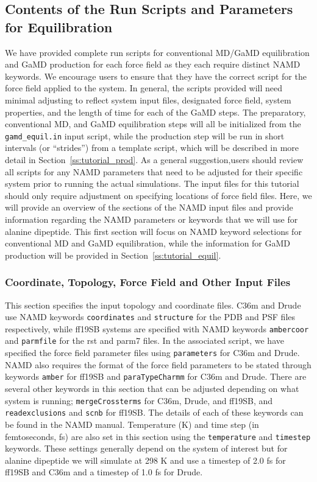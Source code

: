 \documentclass[9pt,tutorial]{livecoms}
\begin{document}
\subsection{Contents of the Run Scripts and Parameters for Equilibration} 
We have provided complete run scripts for conventional MD/GaMD equilibration and GaMD production for each force field as they each require distinct NAMD keywords. We encourage users to ensure that they have the correct script for the force field applied to the system. In general, the scripts provided will need minimal adjusting to reflect system input files, designated force field, system properties, and the length of time for each of the GaMD steps. The preparatory, conventional MD, and GaMD equilibration steps will all be initialized from the \texttt{gamd\_equil.in} input script, while the production step will be run in short intervals (or ``strides'') from a template script, which will be described in more detail in Section~\ref{ss:tutorial_prod}. As a general suggestion,users should review all scripts for any NAMD parameters that need to be adjusted for their specific system prior to running the actual simulations. The input files for this tutorial should only require adjustment on specifying locations of force field files. Here, we will provide an overview of the sections of the NAMD input files and provide information regarding the NAMD parameters or keywords that we will use for alanine dipeptide. This first section will focus on NAMD keyword selections for conventional MD and GaMD equilibration, while the information for GaMD production will be provided in Section~\ref{ss:tutorial_equil}. 

\subsubsection{Coordinate, Topology, Force Field and Other Input Files}
This section specifies the input topology and coordinate files. C36m and Drude use NAMD keywords \texttt{coordinates} and \texttt{structure} for the PDB and PSF files respectively, while ff19SB systems are specified with NAMD keywords \texttt{ambercoor} and \texttt{parmfile} for the rst and parm7 files. In the associated script, we have specified the force field parameter files using \texttt{parameters} for C36m and Drude. NAMD also requires the format of the force field parameters to be stated through keywords \texttt{amber} for ff19SB and \texttt{paraTypeCharmm} for C36m and Drude. There are several other keywords in this section that can be adjusted depending on what system is running; \texttt{mergeCrossterms} for C36m, Drude, and ff19SB, and \texttt{readexclusions} and \texttt{scnb} for ff19SB. The details of each of these keywords can be found in the NAMD manual. Temperature (K) and time step (in femtoseconds, fs) are also set in this section using the \texttt{temperature} and \texttt{timestep} keywords. These settings generally depend on the system of interest but for alanine dipeptide we will simulate at 298 K and use a timestep of 2.0 fs for ff19SB and C36m and a timestep of 1.0 fs for Drude. 
\end{document}
